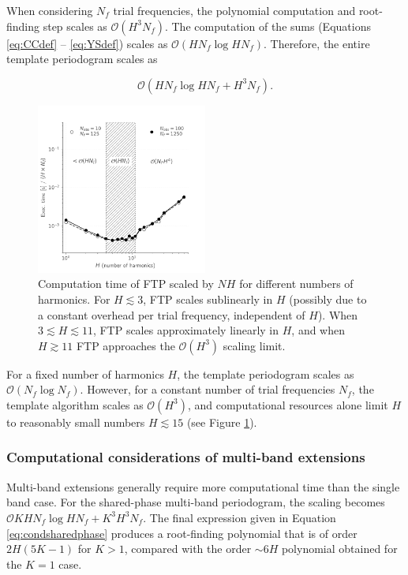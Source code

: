 \documentclass[apj]{emulateapj}
\newcommand{\bigO}{\mathcal{O}}
\begin{document}
When considering $N_f$ trial frequencies, the polynomial computation and root-finding 
step scales as $\bigO(H^3N_f)$. The computation of the sums 
(Equations \ref{eq:CCdef} -- \ref{eq:YSdef}) scales as $\bigO(HN_f\log HN_f)$.
Therefore, the entire template periodogram scales as 

\begin{equation}
\bigO(HN_f \log HN_f + H^3N_f).
\end{equation}

\begin{figure}
    \centering
    \includegraphics[width=0.5\textwidth]{plots/timing_vs_nharm.pdf}
    \caption{\label{fig:timingnharm} Computation time of FTP scaled by $NH$ for
            different numbers of harmonics. For $H\lesssim 3$, FTP scales
            sublinearly in $H$ (possibly due to a constant overhead per
            trial frequency, independent of $H$). When $3 \lesssim H \lesssim 11$,
            FTP scales approximately linearly in $H$, and when $H \gtrsim 11$
            FTP approaches the $\bigO(H^3)$ scaling limit.}
\end{figure}

For a fixed number of harmonics $H$, the template periodogram scales as
$\bigO(N_f\log N_f)$. However, for a constant number of trial frequencies $N_f$, 
the template algorithm scales as $\bigO(H^3)$, and computational resources
alone limit $H$ to reasonably small numbers $H\lesssim15$ (see Figure \ref{fig:timingnharm}).


\subsubsection{Computational considerations of multi-band extensions}
Multi-band extensions generally require more computational
time than the single band case. For the shared-phase multi-band periodogram,
the scaling becomes $\bigO{KHN_f\log HN_f + K^3H^3N_f}$. The final expression given
in Equation \ref{eq:condsharedphase} produces a root-finding polynomial that is of order
$2H(5K - 1)$ for $K > 1$, compared with the order $\sim 6H$ polynomial obtained for
the $K=1$ case.
\end{document}
